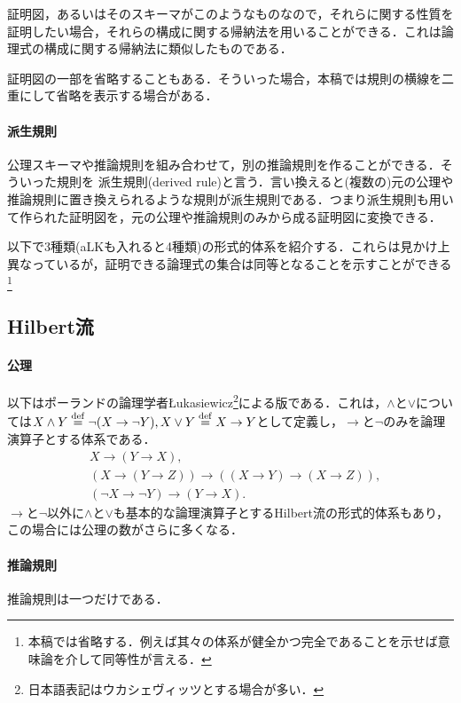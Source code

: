 \documentclass{ltjsarticle}
\theoremstyle{mystyle1}
\theoremstyle{mystyle3}
\theoremstyle{mystyle2}
\newcommand{\dequal}{\ensuremath{\stackrel{\rm{def}}{=}}}
\newcommand{\red}[1]{{\color{red} #1}}
\begin{document}
証明図，あるいはそのスキーマがこのようなものなので，それらに関する性質を証明したい場合，それらの構成に関する帰納法を用いることができる．これは論理式の構成に関する帰納法に類似したものである．

証明図の一部を省略することもある．そういった場合，本稿では規則の横線を二重にして省略を表示する場合がある．
\paragraph{派生規則}
公理スキーマや推論規則を組み合わせて，別の推論規則を作ることができる．そういった規則を\red{派生規則}(derived rule)と言う．言い換えると(複数の)元の公理や推論規則に置き換えられるような規則が派生規則である．つまり派生規則も用いて作られた証明図を，元の公理や推論規則のみから成る証明図に変換できる．

以下で3種類(aLKも入れると4種類)の形式的体系を紹介する．これらは見かけ上異なっているが，証明できる論理式の集合は同等となることを示すことができる\footnote{本稿では省略する．例えば其々の体系が健全かつ完全であることを示せば意味論を介して同等性が言える．}
\subsection{Hilbert流}
\paragraph{公理}
以下はポーランドの論理学者\L ukasiewicz\footnote{日本語表記はウカシェヴィッツとする場合が多い．}による版である．これは，$\wedge$と$\vee$については$X\wedge Y\dequal \neg(X \to \neg Y), X\vee Y\dequal X\to Y$として定義し，$\to$と$\neg$のみを論理演算子とする体系である．
\begin{align}
   & X \to \left(Y\to X\right),\label{hilbert1}                                                                          \\
   & \left(X \to \left(Y \to Z\right)\right)\to \left(\left(X\to Y\right)\to \left(X\to Z\right)\right),\label{hilbert2} \\
   & \left(\neg X\to \neg Y\right) \to \left(Y\to X\right).\label{hilbert3}
\end{align}
$\to$と$\neg$以外に$\wedge$と$\vee$も基本的な論理演算子とするHilbert流の形式的体系もあり，この場合には公理の数がさらに多くなる．
\paragraph{推論規則}
推論規則は一つだけである．
\begin{prooftree}
  \label{HilInfRule}
\end{prooftree}
\end{document}
